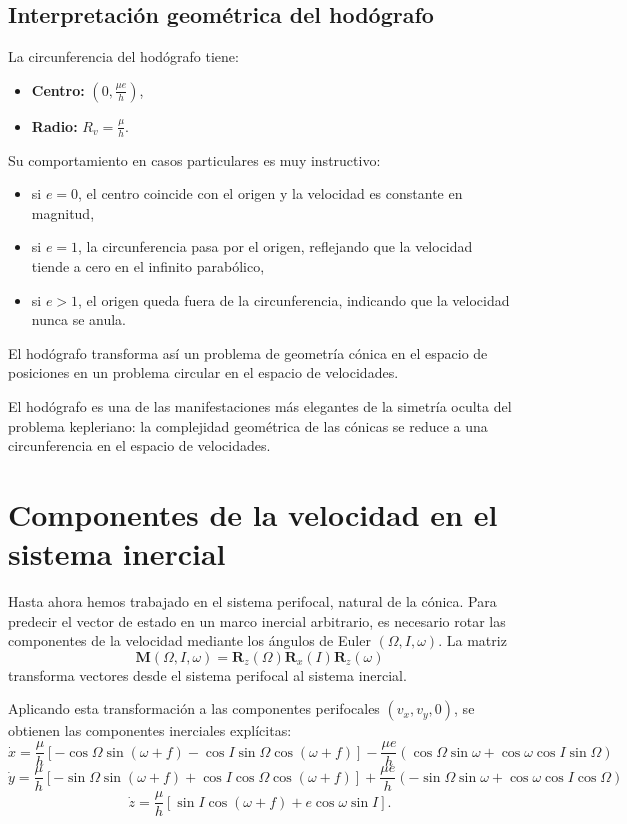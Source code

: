 \subsection{Interpretación geométrica del hodógrafo}
La circunferencia del hodógrafo tiene:
\begin{itemize}
    \item \textbf{Centro:} \(\left(0,\frac{\mu e}{h}\right)\),
    \item \textbf{Radio:} \(R_v = \frac{\mu}{h}\).
\end{itemize}

Su comportamiento en casos particulares es muy instructivo:
\begin{itemize}
    \item si \(e=0\), el centro coincide con el origen y la velocidad es constante en magnitud,
    \item si \(e=1\), la circunferencia pasa por el origen, reflejando que la velocidad tiende a cero en el infinito parabólico,
    \item si \(e>1\), el origen queda fuera de la circunferencia, indicando que la velocidad nunca se anula.
\end{itemize}

El hodógrafo transforma así un problema de geometría cónica en el espacio de posiciones en un problema circular en el espacio de velocidades.

\begin{importante}
El hodógrafo es una de las manifestaciones más elegantes de la simetría oculta del problema kepleriano: la complejidad geométrica de las cónicas se reduce a una circunferencia en el espacio de velocidades.
\end{importante}

\section{Componentes de la velocidad en el sistema inercial}
Hasta ahora hemos trabajado en el sistema perifocal, natural de la cónica. Para predecir el vector de estado en un marco inercial arbitrario, es necesario rotar las componentes de la velocidad mediante los ángulos de Euler \((\Omega,I,\omega)\). La matriz
\[
\mathbf{M}(\Omega,I,\omega)=\mathbf{R}_z(\Omega)\mathbf{R}_x(I)\mathbf{R}_z(\omega)
\]
transforma vectores desde el sistema perifocal al sistema inercial.

Aplicando esta transformación a las componentes perifocales \((v_x,v_y,0)\), se obtienen las componentes inerciales explícitas:
\[
\dot{x} = \frac{\mu}{h}\left[-\cos\Omega\sin(\omega+f)-\cos I\sin\Omega\cos(\omega+f)\right]-\frac{\mu e}{h}\left(\cos\Omega\sin\omega+\cos\omega\cos I\sin\Omega\right)
\]
\[
\dot{y} = \frac{\mu}{h}\left[-\sin\Omega\sin(\omega+f)+\cos I\cos\Omega\cos(\omega+f)\right]+\frac{\mu e}{h}\left(-\sin\Omega\sin\omega+\cos\omega\cos I\cos\Omega\right)
\]
\[
\dot{z} = \frac{\mu}{h}\left[\sin I\cos(\omega+f)+e\cos\omega\sin I\right].
\]

